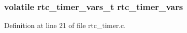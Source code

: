\subsubsection[{\texorpdfstring{rtc\+\_\+timer\+\_\+vars}{rtc_timer_vars}}]{\setlength{\rightskip}{0pt plus 5cm}volatile {\bf rtc\+\_\+timer\+\_\+vars\+\_\+t} rtc\+\_\+timer\+\_\+vars}\hypertarget{iot-lab___a8-_m3_2rtc__timer_8c_ab5859ed0606df1d431471ed50bb1ec73}{}\label{iot-lab___a8-_m3_2rtc__timer_8c_ab5859ed0606df1d431471ed50bb1ec73}


Definition at line 21 of file rtc\+\_\+timer.\+c.

